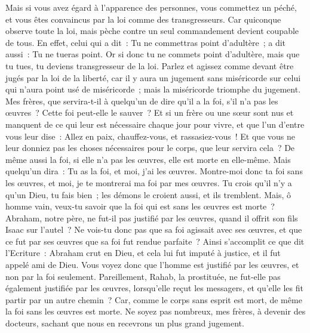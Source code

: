 \begin{multicols}{2}
Mais si vous avez égard à l'apparence des personnes, vous commettez un péché, et vous êtes convaincus par la loi comme des transgresseurs.
Car quiconque observe toute la loi, mais pèche contre un seul commandement devient coupable de tous.
En effet, celui qui a dit~: Tu ne commettras point d'adultère~; a dit aussi~: Tu ne tueras point. Or si donc tu ne commets point d'adultère, mais que tu tues, tu deviens transgresseur de la loi.
Parlez et agissez comme devant être jugés par la loi de la liberté,
car il y aura un jugement sans miséricorde sur celui qui n'aura point usé de miséricorde~; mais la miséricorde triomphe du jugement.
Mes frères, que servira-t-il à quelqu'un de dire qu'il a la foi, s'il n'a pas les œuvres~? Cette foi peut-elle le sauver~?
Et si un frère ou une sœur sont nus et manquent de ce qui leur est nécessaire chaque jour pour vivre,
et que l'un d'entre vous leur dise~: Allez en paix, chauffez-vous, et rassasiez-vous~! Et que vous ne leur donniez pas les choses nécessaires pour le corps, que leur servira cela~?
De même aussi la foi, si elle n'a pas les œuvres, elle est morte en elle-même.
Mais quelqu'un dira~: Tu as la foi, et moi, j'ai les œuvres. Montre-moi donc ta foi sans les œuvres, et moi, je te montrerai ma foi par mes œuvres.
Tu crois qu'il n'y a qu'un Dieu, tu fais bien~; les démons le croient aussi, et ils tremblent.
Mais, ô homme vain, veux-tu savoir que la foi qui est sans les œuvres est morte~?
Abraham, notre père, ne fut-il pas justifié par les œuvres, quand il offrit son fils Isaac sur l'autel~?
Ne vois-tu donc pas que sa foi agissait avec ses œuvres, et que ce fut par ses œuvres que sa foi fut rendue parfaite~?
Ainsi s'accomplit ce que dit l'Ecriture~: Abraham crut en Dieu, et cela lui fut imputé à justice, et il fut appelé ami de Dieu.
Vous voyez donc que l'homme est justifié par les œuvres, et non par la foi seulement.
Pareillement, Rahab, la prostituée, ne fut-elle pas également justifiée par les œuvres, lorsqu'elle reçut les messagers, et qu'elle les fit partir par un autre chemin~?
Car, comme le corps sans esprit est mort, de même la foi sans les œuvres est morte.
\VerseOne{}Ne soyez pas nombreux, mes frères, à devenir des docteurs, sachant que nous en recevrons un plus grand jugement.

\end{multicols}
